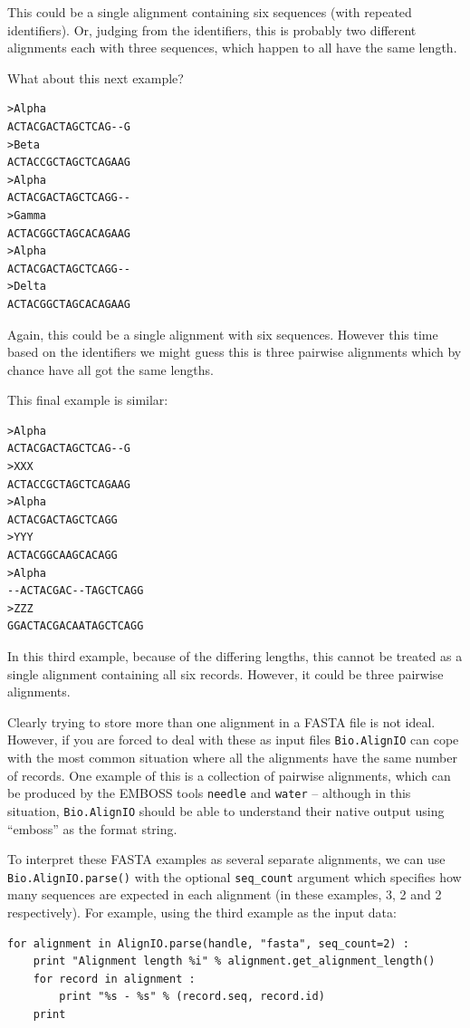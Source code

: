 \documentclass{report}
\begin{document}
\noindent This could be a single alignment containing six sequences (with repeated identifiers).  Or, judging from the identifiers, this is probably two different alignments each with three sequences, which happen to all have the same length.

What about this next example?

\begin{verbatim}
>Alpha
ACTACGACTAGCTCAG--G
>Beta
ACTACCGCTAGCTCAGAAG
>Alpha
ACTACGACTAGCTCAGG--
>Gamma
ACTACGGCTAGCACAGAAG
>Alpha
ACTACGACTAGCTCAGG--
>Delta
ACTACGGCTAGCACAGAAG
\end{verbatim}

\noindent Again, this could be a single alignment with six sequences.  However this time based on the identifiers we might guess this is three pairwise alignments which by chance have all got the same lengths.

This final example is similar:

\begin{verbatim}
>Alpha
ACTACGACTAGCTCAG--G
>XXX
ACTACCGCTAGCTCAGAAG
>Alpha
ACTACGACTAGCTCAGG
>YYY
ACTACGGCAAGCACAGG
>Alpha
--ACTACGAC--TAGCTCAGG
>ZZZ
GGACTACGACAATAGCTCAGG
\end{verbatim}

\noindent In this third example, because of the differing lengths, this cannot be treated as a single alignment containing all six records.  However, it could be three pairwise alignments.

Clearly trying to store more than one alignment in a FASTA file is not ideal.  However, if you are forced to deal with these as input files \verb|Bio.AlignIO| can cope with the most common situation where all the alignments have the same number of records.
One example of this is a collection of pairwise alignments, which can be produced by the EMBOSS tools \verb|needle| and \verb|water| -- although in this situation, \verb|Bio.AlignIO| should be able to understand their native output using ``emboss'' as the format string.

To interpret these FASTA examples as several separate alignments, we can use \verb|Bio.AlignIO.parse()| with the optional \verb|seq_count| argument which specifies how many sequences are expected in each alignment (in these examples, 3, 2 and 2 respectively).
For example, using the third example as the input data:

\begin{verbatim}
for alignment in AlignIO.parse(handle, "fasta", seq_count=2) :
    print "Alignment length %i" % alignment.get_alignment_length()
    for record in alignment :
        print "%s - %s" % (record.seq, record.id)
    print
\end{verbatim}
\end{document}
